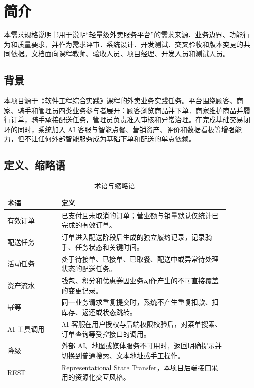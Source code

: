 \section{简介}

本需求规格说明书用于说明“轻量级外卖服务平台”的需求来源、业务边界、功能行为和质量要求，并作为需求评审、系统设计、开发测试、交叉验收和版本变更的共同依据。文档面向课程教师、验收人员、项目经理、开发人员和测试人员。

\subsection{背景}

本项目源于《软件工程综合实践》课程的外卖业务实践任务。平台围绕顾客、商家、骑手和管理员四类业务参与者展开：顾客浏览商品并下单，商家维护商品并履行订单，骑手承接配送任务，管理员负责准入审核和异常治理。在完成基础交易闭环的同时，系统加入 AI 客服与智能点餐、营销资产、评价和数据看板等增强能力，但不让任何外部智能服务成为基础下单和配送的单点依赖。

\subsection{定义、缩略语}

\begin{longtable}{|L{0.22\linewidth}|L{0.68\linewidth}|}
\caption{术语与缩略语}\label{tab:terms}\\ \hline
\textbf{术语} & \textbf{定义} \\ \hline
有效订单 & 已支付且未取消的订单；营业额与销量默认仅统计已完成的有效订单。 \\ \hline
配送任务 & 订单进入配送阶段后生成的独立履约记录，记录骑手、任务状态和关键时间。 \\ \hline
活动任务 & 处于待接单、已接单、已取餐、配送中或异常待处理状态的配送任务。 \\ \hline
资产流水 & 钱包、积分和优惠券因业务动作产生的不可直接覆盖的变更记录。 \\ \hline
幂等 & 同一业务请求重复提交时，系统不产生重复扣款、扣库存、返还或状态跳转。 \\ \hline
AI 工具调用 & AI 客服在用户授权与后端权限校验后，对菜单搜索、订单查询等受控接口的调用。 \\ \hline
降级 & 外部 AI、地图或媒体服务不可用时，返回明确提示并切换到普通搜索、文本地址或手工操作。 \\ \hline
REST & Representational State Transfer，本项目后端接口采用的资源化交互风格。 \\ \hline
\end{longtable}


